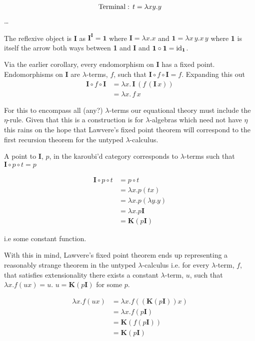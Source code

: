 \documentclass[a4paper,10pt]{article}
\begin{document}
\begin{align*}
    &\textnormal{Terminal}: \, t = \lambda x y . y \\
\end{align*}
\ldots

The reflexive object is \textbf{I} as $\textbf{I}^\textbf{I} = \textbf{1}$ where
$\textbf{I} = \lambda x.x$ and $\textbf{1} = \lambda x \, y . x \, y$ where
\textbf{1} is itself the arrow both ways between \textbf{1} and \textbf{I} and
$\textbf{1} \circ \textbf{1} = \textnormal{id}_{\textbf{1}}$.

Via the earlier corollary, every endomorphism on \textbf{I} has a fixed point.
Endomorphisms on \textbf{I} are $\lambda$-terms, $f$, such that $\textbf{I}
\circ f \circ \textbf{I} = f$. Expanding this out
\begin{align*}
    \textbf{I} \circ f \circ \textbf{I} &= \lambda x . \, \textbf{I} \, (f \, (\textbf{I}
    \, x)) \\
    &= \lambda x . \, f \, x
\end{align*}

For this to encompass all (any?) $\lambda$-terms our equational theory must
include the $\eta$-rule. Given that this is a construction is for
$\lambda$-algebras which need not have $\eta$ this rains on the hope that
Lawvere's fixed point theorem will correspond to the first recursion theorem for
the untyped $\lambda$-calculus.

A point to \textbf{I}, $p$, in the karoubi'd category corresponds to $\lambda$-terms such
that $\textbf{I} \circ p \circ t = p$

\begin{align*}
    \textbf{I} \circ p \circ t &= p \circ t \\
    &= \lambda x . p (t x) \\
    &= \lambda x . p (\lambda y . y) \\
    &= \lambda x . p \textbf{I} \\
    &= \textbf{K} (p \textbf{I})
\end{align*}

i.e some constant function.

With this in mind, Lawvere's fixed point theorem ends up representing a
reasonably strange theorem in the untyped $\lambda$-calculus i.e. for every
$\lambda$-term, $f$, that satisfies extensionality there exists a constant
$\lambda$-term, $u$, such that $\lambda x . f (u x) = u$. $u =
\textbf{K}(p\textbf{I})$ for some $p$.

\begin{align*}
    \lambda x . f (u x ) &= \lambda x . f(( \textbf{K} (p \textbf{I})) x) \\
    &= \lambda x . f(p \textbf{I}) \\
    &= \textbf{K} (f (p \textbf{I})) \\
    &= \textbf{K} (p \textbf{I})
\end{align*}
\end{document}
